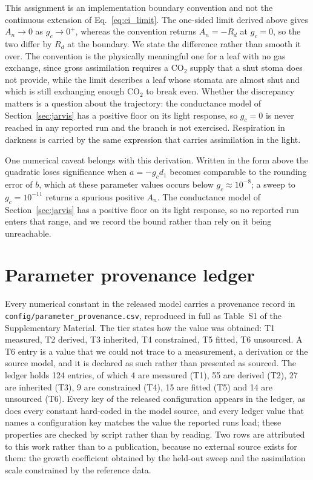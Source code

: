 This assignment is an implementation boundary convention and not the continuous
extension of Eq.~\eqref{eq:ci_limit}. The one-sided limit derived above gives
$A_n \to 0$ as $g_c \to 0^{+}$, whereas the convention returns $A_n = -R_d$ at
$g_c = 0$, so the two differ by $R_d$ at the boundary. We state the difference
rather than smooth it over. The convention is the physically meaningful one for a
leaf with no gas exchange, since gross assimilation requires a CO$_2$ supply that
a shut stoma does not provide, while the limit describes a leaf whose stomata are
almost shut and which is still exchanging enough CO$_2$ to break even. Whether
the discrepancy matters is a question about the trajectory: the conductance model
of Section~\ref{sec:jarvis} has a positive floor on its light response, so
$g_c = 0$ is never reached in any reported run and the branch is not exercised.
Respiration in darkness is carried by the same expression that carries
assimilation in the light.

One numerical caveat belongs with this derivation. Written in the form above the
quadratic loses significance when $a = -g_c d_1$ becomes comparable to the
rounding error of $b$, which at these parameter values occurs below
$g_c \approx 10^{-8}$; a sweep to $g_c = 10^{-11}$ returns a spurious positive
$A_n$. The conductance model of Section~\ref{sec:jarvis} has a positive floor on
its light response, so no reported run enters that range, and we record the
bound rather than rely on it being unreachable.

\section{Parameter provenance ledger}
\label{app:params}

Every numerical constant in the released model carries a provenance record in
\texttt{config/parameter\_provenance.csv}, reproduced in full as Table~S1 of the
Supplementary Material. The tier states how the value
was obtained: T1 measured, T2 derived, T3 inherited, T4 constrained, T5 fitted, T6 unsourced. A T6 entry is a value that
we could not trace to a measurement, a derivation or the source model, and it is
declared as such rather than presented as sourced. The ledger holds 124 entries, of which 4 are measured (T1), 55 are derived (T2), 27 are inherited (T3), 9 are constrained (T4), 15 are fitted (T5) and 14 are unsourced (T6). Every key of the released configuration appears in the ledger, as does every constant hard-coded in the model source, and every ledger value that names a configuration key matches the value the reported runs load; these properties are checked by script rather than by reading. Two rows are attributed to this work rather than to a publication, because no external source exists for them: the growth coefficient obtained by the held-out sweep and the assimilation scale constrained by the reference data.


